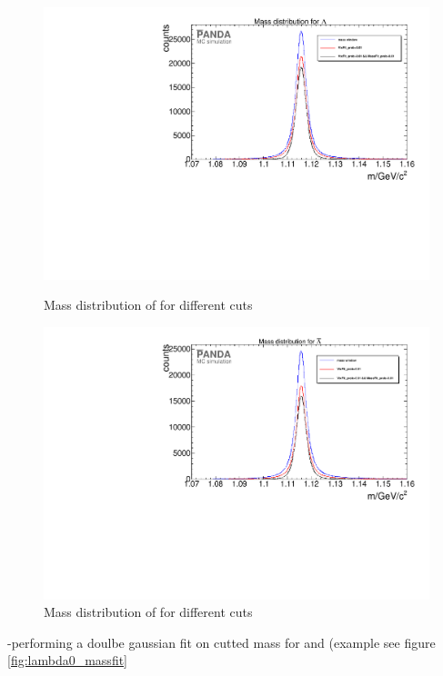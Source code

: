 		\begin{figure}
			\centering
				\includegraphics[width=1.1\textwidth]{./plots/lambda0/lambda0_m_diffcuts.pdf}
			\caption{Mass distribution of \lam for different cuts}
			\label{fig:lambda0_massdiffcuts}
			
				\includegraphics[width=1.1\textwidth]{./plots/antilambda0/antiLambda0_m_diffcuts.pdf}
			\caption{Mass distribution of \alam for different cuts}
			\label{fig:antilambda0_massdiffcuts}
		\end{figure}
		
		-performing a doulbe gaussian fit on cutted mass for \lam and \alam (example see figure \ref{fig:lambda0_massfit}
		
